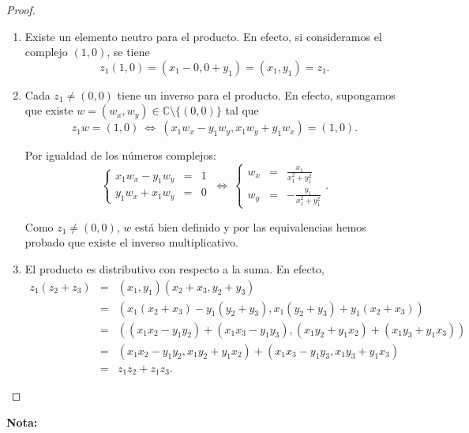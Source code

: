 \begin{proof}
\begin{enumerate}
\item Existe un elemento neutro para el producto. En efecto, si consideramos el complejo $(1,0)$, se tiene
$$z_1 (1,0) = (x_1 - 0, 0 + y_1) = (x_1,y_1) = z_1.$$

\item Cada $z_1 \neq (0,0)$ tiene un inverso para el producto. En efecto, supongamos que existe $w = (w_x, w_y) \in \mathbb{C} \setminus \{(0,0)\}$ tal que
$$z_1 w = (1,0) ~\Leftrightarrow~(x_1 w_x - y_1 w_y, x_1w_y + y_1 w_x) = (1,0).$$

Por igualdad de los números complejos:
\begin{equation*}
 \left\{ \begin{array}{ccl}
x_1 w_x - y_1 w_y &=& 1 \\
y_1 w_x + x_1 w_y &=& 0
\end{array}  \right.  ~\Leftrightarrow~ \left\{ \begin{array}{ccl}
 w_x  &=& \frac{x_1}{x_1^2 + y_1^2} \\
 w_y &=& - \frac{y_1}{x_1^2 + y_1^2}
\end{array}  \right.  .
\end{equation*}

Como $z_1 \neq (0,0)$, $w$ está bien definido y por las equivalencias hemos probado que existe el inverso multiplicativo.

\item El producto es distributivo con respecto a la suma. En efecto,
\begin{eqnarray*}
z_1 (z_2 + z_3) &=& (x_1, y_1) (x_2 + x_3, y_2 + y_3) \\
&=& (x_1 (x_2 + x_3) - y_1(y_2 + y_3), x_1 (y_2 + y_3) + y_1(x_2 + x_3)) \\
&=& ((x_1x_2 - y_1 y_2) + (x_1x_3 - y_1y_3), (x_1 y_2 + y_1 x_2) + (x_1 y_3 + y_1 x_3)) \\
&=& (x_1 x_2 - y_1 y_2, x_1 y_2 + y_1x_2) + (x_1 x_3 - y_1y_3, x_1 y_3 + y_1 x_3) \\
&=& z_1 z_2 + z_1 z_3.
\end{eqnarray*}
\end{enumerate}

\end{proof}

\textbf{Nota:} 

